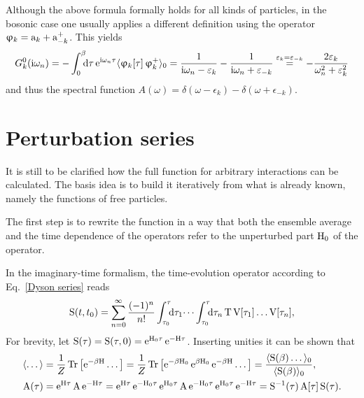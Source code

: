 Although the above formula formally holds for all kinds of particles, in the
bosonic case one usually applies a different definition using the operator
$\upvarphi_k = \mathrm a_k + \mathrm a_{-k}^+$. This yields
%
\begin{equation} \label{D_0(i omega_n)}
    G_k^0(\I \omega_n) = -\int \from 0 \till \beta \D \tau \,
    \E^{\I \omega_n \tau} \av{\upphi_k[\tau] \, \upphi_k^+}_0
    = \frac 1 {\I \omega_n - \epsilon_k} - \frac 1 {\I \omega_n + \epsilon_{-k}}
    \overset{\epsilon_k = \epsilon_{-k}} =
    -\frac{2 \epsilon_k}{\omega_n^2 + \epsilon_k^2}
\end{equation}
%
and thus the spectral function $A(\omega) = \delta(\omega - \epsilon_k) -
\delta(\omega + \epsilon_{-k})$.

\section{Perturbation series}

It is still to be clarified how the full  function for arbitrary
interactions can be calculated. The basis idea is to build it iteratively from
what is already known, namely the  functions of free particles.

The first step is to rewrite the  function in a way that both the
ensemble average and the time dependence of the operators refer to the
unperturbed part $\mathrm H_0$ of the  operator.

In the imaginary-time formalism, the time-evolution operator according to
Eq.~\ref{Dyson series} reads
%
\begin{equation} \label{Matsubara-Dyson series}
    \op S(t, t_0) = \sum_{n = 0}^\infty \frac{(-1)^n}{n!}
    \int \from{\tau_0} \till \tau \D \tau_1 \dots
    \int \from{\tau_0} \till \tau \D \tau_n \,
    \op T \, \op V[\tau_1] \dots \op V[\tau_n],
\end{equation}
%
For brevity, let $\mathrm S(\tau) = \mathrm S(\tau, 0) = \mathrm e^{\mathrm H_0 \tau} \, \mathrm e^{-\mathrm H
\tau}$. Inserting unities it can be shown that
%
\begin{align*}
    \langle\dots\rangle &= \frac 1 Z \operatorname{Tr} \big[ \mathrm e^{-\beta \mathrm H} \dots \big]
    = \frac 1 Z \operatorname{Tr} \big[
        \mathrm e^{-\beta \mathrm H_0} \, \mathrm e^{\beta \mathrm H_0} \, \mathrm e^{-\beta \mathrm H} \dots
    \big]
    = \frac{\langle\mathrm S(\beta) \dots\rangle_0}{\langle\mathrm S(\beta)\rangle_0},
    \\
    \mathrm A(\tau) &= \mathrm e^{\mathrm H \tau} \, \mathrm A \, \mathrm e^{-\mathrm H \tau}
    = \mathrm e^{\mathrm H \tau} \, \mathrm e^{-\mathrm H_0 \tau} \,
    \mathrm e^{\mathrm H_0 \tau} \, \mathrm A \, \mathrm e^{-\mathrm H_0 \tau} \,
    \mathrm e^{\mathrm H_0 \tau} \, \mathrm e^{-\mathrm H \tau}
    = \mathrm S^{-1}(\tau) \, \mathrm A[\tau] \, \mathrm S(\tau).
\end{align*}

